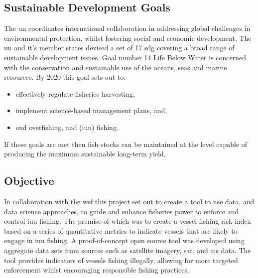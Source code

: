 \subsection{Sustainable Development Goals}
The \gls{un} coordinates international collaboration in addressing global challenges in environmental protection, whilst fostering social and economic development. The \gls{un} and it's member states devised a set of 17 \gls{sdg} covering a broad range of sustainable development issues. Goal number 14 Life Below Water is concerned with the conservation and sustainable use of the oceans, seas and marine resources. By 2020 this goal sets out to:
\begin{itemize}
    \item effectively regulate fisheries harvesting,
    \item implement science-based management plans, and,
    \item end overfishing,   and  (\gls{iuu}) fishing.
\end{itemize}
If these goals are met then fish stocks can be maintained at the level capable of producing the maximum sustainable long-term yield.

\subsection{Objective}
In collaboration with the \gls{wef} this project set out to create a tool to use data, and data science approaches, to guide and enhance fisheries power to enforce and control \gls{iuu} fishing. The premise of which was to create a vessel fishing risk index based on a series of quantitative metrics to indicate vessels that are likely to engage in \gls{iuu} fishing. A proof-of-concept open source tool was developed using aggregate data sets from sources such as satellite imagery, \gls{sar}, and \gls{ais} data. The tool provides indicators of vessels fishing illegally, allowing for more targeted enforcement whilst encouraging responsible fishing practices.

